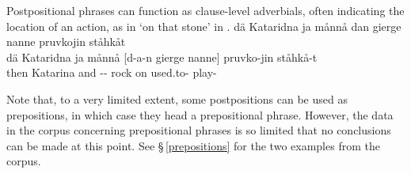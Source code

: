 Postpositional phrases %
can function as clause-level adverbials, often indicating the location of an action, as in  ‘on that stone’ in . 
\ea\label{ADVppEx1}%
\glll	dä Kataridna ja månnå dan gierge nanne pruvkojin ståhkåt\\
	dä Kataridna ja månnå {[d-a-n} gierge {nanne]\subPP} pruvko-jin ståhkå-t\\
	then Katarina\BS{} and  -- rock\BS{} on used.to- play-\\\nopagebreak
{}	
\z


Note that, to a very limited extent, some postpositions can be used as prepositions, in which case they head a prepositional phrase. However, the data in the corpus concerning prepositional phrases is so limited that no conclusions can be made at this point. See §\,\ref{prepositions} for the two examples from the corpus. 





%